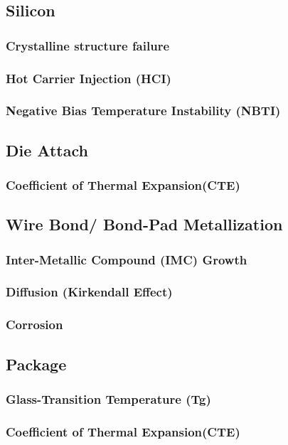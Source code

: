 \documentclass{article}
\begin{document}
	
\subsection{Silicon}
	\subsubsection{Crystalline structure failure}
	\subsubsection{Hot Carrier Injection (HCI)}
	\subsubsection{Negative Bias Temperature Instability (NBTI)}
	
\subsection{Die Attach}
	\subsubsection{Coefficient of Thermal Expansion(CTE)}
	
\subsection{Wire Bond/ Bond-Pad Metallization}
	\subsubsection{Inter-Metallic Compound (IMC) Growth}
	\subsubsection{Diffusion (Kirkendall Effect)}
	\subsubsection{Corrosion}
	
\subsection{Package}
	\subsubsection{Glass-Transition Temperature (Tg)}
	\subsubsection{Coefficient of Thermal Expansion(CTE)}
\end{document}
